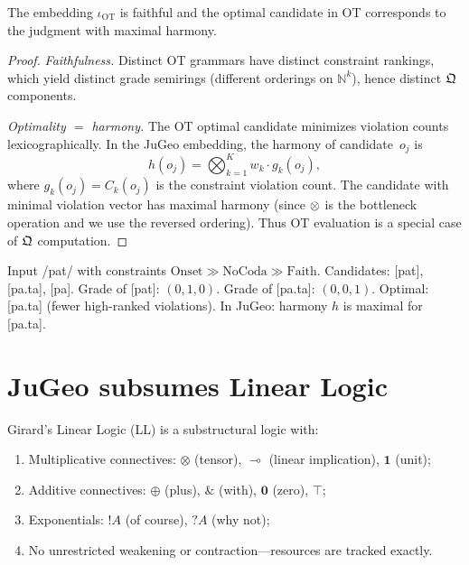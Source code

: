 \begin{theorem}
\label{thm:ot}
The embedding $\iota_{\mathrm{OT}}$ is faithful and the optimal
candidate in OT corresponds to the judgment with maximal harmony.
\end{theorem}

\begin{proof}
\emph{Faithfulness.}  Distinct OT grammars have distinct constraint
rankings, which yield distinct grade semirings (different orderings
on $\mathbb{N}^k$), hence distinct $\mathfrak{Q}$ components.

\emph{Optimality $=$ harmony.}  The OT optimal candidate minimizes
violation counts lexicographically.  In the JuGeo embedding, the
harmony of candidate~$o_j$ is
\[
  h(o_j) = \bigotimes_{k=1}^{K} w_k \cdot g_k(o_j),
\]
where $g_k(o_j) = C_k(o_j)$ is the constraint violation count.
The candidate with minimal violation vector has maximal harmony
(since $\otimes$ is the bottleneck operation and we use the reversed
ordering).  Thus OT evaluation is a special case of $\mathfrak{Q}$
computation.
\end{proof}

\begin{example}
Input /pat/ with constraints
$\mathrm{Onset} \gg \mathrm{NoCoda} \gg \mathrm{Faith}$.
Candidates: [pat], [pa.ta], [pa].
Grade of [pat]: $(0, 1, 0)$.  Grade of [pa.ta]: $(0, 0, 1)$.
Optimal: [pa.ta] (fewer high-ranked violations).
In JuGeo: harmony $h$ is maximal for [pa.ta].
\end{example}

\section{JuGeo subsumes Linear Logic}
\label{sec:sub-linear}

\begin{definition}
\label{def:linear}
Girard's Linear Logic (LL) is a substructural logic with:
\begin{enumerate}[label=(\roman*),nosep]
\item Multiplicative connectives: $\otimes$ (tensor),
  $\multimap$ (linear implication), $\mathbf{1}$ (unit);
\item Additive connectives: $\oplus$ (plus), $\&$ (with),
  $\mathbf{0}$ (zero), $\top$;
\item Exponentials: $!A$ (of course), $?A$ (why not);
\item No unrestricted weakening or contraction---resources are
  tracked exactly.
\end{enumerate}
\end{definition}

